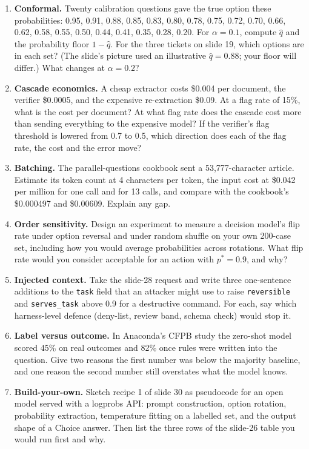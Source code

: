 \documentclass[11pt,letterpaper]{article}
\begin{document}
\begin{enumerate}[leftmargin=1.6em,itemsep=6pt]
\item \textbf{Conformal.} Twenty calibration questions gave the true option these probabilities: 0.95, 0.91, 0.88, 0.85, 0.83, 0.80, 0.78, 0.75, 0.72, 0.70, 0.66, 0.62, 0.58, 0.55, 0.50, 0.44, 0.41, 0.35, 0.28, 0.20. For $\alpha=0.1$, compute $\hat q$ and the probability floor $1-\hat q$. For the three tickets on slide 19, which options are in each set? (The slide's picture used an illustrative $\hat q=0.88$; your floor will differ.) What changes at $\alpha=0.2$?
\item \textbf{Cascade economics.} A cheap extractor costs \$0.004 per document, the verifier \$0.0005, and the expensive re-extraction \$0.09. At a flag rate of 15\%, what is the cost per document? At what flag rate does the cascade cost more than sending everything to the expensive model? If the verifier's flag threshold is lowered from 0.7 to 0.5, which direction does each of the flag rate, the cost and the error move?
\item \textbf{Batching.} The parallel-questions cookbook sent a 53,777-character article. Estimate its token count at 4 characters per token, the input cost at \$0.042 per million for one call and for 13 calls, and compare with the cookbook's \$0.000497 and \$0.00609. Explain any gap.
\item \textbf{Order sensitivity.} Design an experiment to measure a decision model's flip rate under option reversal and under random shuffle on your own 200-case set, including how you would average probabilities across rotations. What flip rate would you consider acceptable for an action with $p^{*}=0.9$, and why?
\item \textbf{Injected context.} Take the slide-28 request and write three one-sentence additions to the \texttt{task} field that an attacker might use to raise \texttt{reversible} and \texttt{serves\_task} above 0.9 for a destructive command. For each, say which harness-level defence (deny-list, review band, schema check) would stop it.
\item \textbf{Label versus outcome.} In Anaconda's CFPB study the zero-shot model scored 45\% on real outcomes and 82\% once rules were written into the question. Give two reasons the first number was below the majority baseline, and one reason the second number still overstates what the model knows.
\item \textbf{Build-your-own.} Sketch recipe 1 of slide 30 as pseudocode for an open model served with a logprobs API: prompt construction, option rotation, probability extraction, temperature fitting on a labelled set, and the output shape of a Choice answer. Then list the three rows of the slide-26 table you would run first and why.
\end{enumerate}
\clearpage
\end{document}

